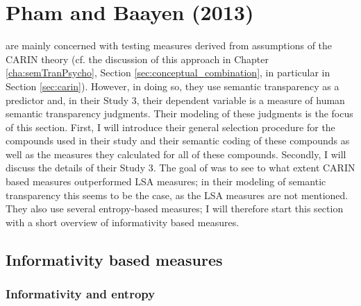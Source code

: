 

\section{Pham and Baayen (2013)}
\label{sec:phambaayen2013}

\citet{PhamandBaayen:2013} are mainly concerned with testing measures
derived from assumptions of the CARIN theory (cf. the discussion of
this approach in Chapter \ref{cha:semTranPsycho}, Section \ref{sec:conceptual_combination}, in
particular in Section \ref{sec:carin}). 
However, in doing so, they use
semantic transparency as a predictor and, in their Study 3, 
their dependent variable is a measure of human semantic transparency
judgments. Their modeling of these judgments is the focus of this
section. First, I will introduce their general selection procedure for
the compounds used in their study and their semantic coding of these
compounds as well as the measures they calculated for
all of these compounds. Secondly, I will discuss the details of their
Study 3. The goal of \citet{PhamandBaayen:2013} was to see to what extent
CARIN based measures outperformed LSA measures; in their modeling of
semantic transparency this seems to be the case, as the LSA measures
are not mentioned. They also use several entropy-based measures; I will
therefore start this section with a short overview of informativity
based measures.

\subsection{Informativity based measures}

\subsubsection{Informativity and entropy}
\label{sec:informativity}

